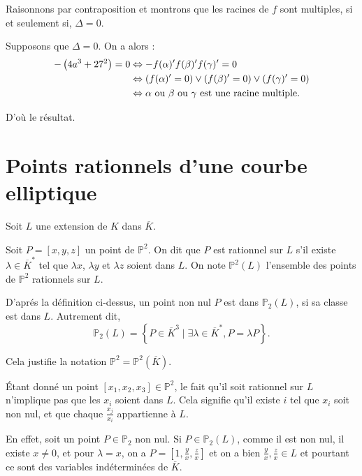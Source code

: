 \begin{demonstration}[Lemme]
Raisonnons par contraposition et montrons que les racines de $f$ sont multiples, si et
seulement si, $\Delta = 0$. 

Supposons que $\Delta = 0$. On a alors :
 \begin{align*}
     - \left( 4a^3 + 27^2 \right) = 0 &\Leftrightarrow - f(\alpha)' f(\beta )' f(\gamma)' = 0 \\
                                      & \Leftrightarrow \left( f(\alpha)' = 0 \right) \vee \left( f(\beta )' = 0 \right) \vee \left( f(\gamma)' = 0 \right) \\
                                      &\Leftrightarrow \alpha \text{ ou } \beta \text{ ou } \gamma \text{ est une racine multiple}
.\end{align*}

D'où le résultat.
\end{demonstration}

\section{Points rationnels d'une courbe elliptique}

Soit $L$ une extension de $K$ dans $\overline{K}$.

\begin{definition}
    Soit $P=\left[ x,y,z \right] $ un point de $\mathbb{P}^2$. On dit que $P$ est rationnel sur $L$ s'il existe $\lambda \in \overline{K}^{*}$ tel que $\lambda x$, $\lambda y$ et $\lambda z$ soient dans $L$. On note $\mathbb{P}^2(L)$ l'ensemble des points de $\mathbb{P}^2$ rationnels sur $L$.

\end{definition}

D'aprés la définition ci-dessus, un point non nul $P$ est dans $\mathbb{P}_{2}(L)$, si sa classe est dans $L$. Autrement
dit, 
\[
\mathbb{P}_{2}(L)=\left\{ P \in \overline{K}^{3} \mid \exists \lambda \in \overline{K}^{*}, P =
\lambda P\right\} 
.\] 

Cela justifie la notation $\mathbb{P}^2 = \mathbb{P}^2(\overline{K})$.

\begin{remarque}
    Étant donné un point $[x_1,x_2,x_3] \in \mathbb{P}^2$, le fait qu'il soit rationnel sur $L$ n'implique pas que les $x_{i}$ soient dans $L$. Cela signifie qu'il existe $i$ tel que $x_{i}$ soit non nul, et que chaque $\frac{x_{j}}{x_{i}}$ appartienne à $L$.

    En effet, soit un point $P \in \mathbb{P}_{2}$ non nul. Si $P \in \mathbb{P}_{2}(L)$,
    comme il est non nul, il existe $x \neq 0$, et pour $\lambda = x$, on a $P =
    [1,\frac{y}{x},\frac{z}{x}]$ et on a bien $\frac{y}{x},\frac{z}{x} \in L$ et pourtant ce
    sont des variables indéterminées de $\overline{K}$.
\end{remarque}

